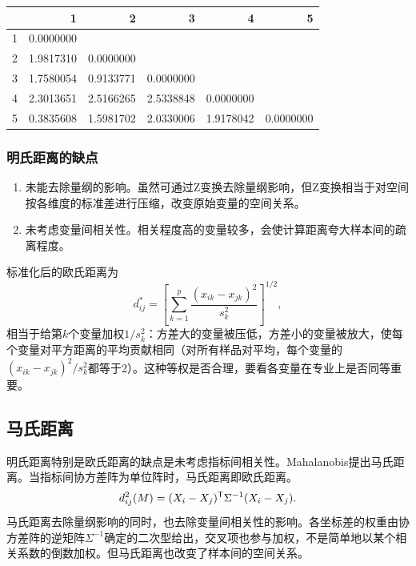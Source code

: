 \par\addvspace{5pt}\begin{center}\begin{minipage}{\linewidth}\centering
\small
{}
\begin{tabular}{lrrrrr}\toprule
 &{\bfseries  1 }&{\bfseries  2 }&{\bfseries  3 }&{\bfseries  4 }&{\bfseries  5}\\\midrule
1 & 0.0000000 &  &  &  & \\
2 & 1.9817310 & 0.0000000 &  &  & \\
3 & 1.7580054 & 0.9133771 & 0.0000000 &  & \\
4 & 2.3013651 & 2.5166265 & 2.5338848 & 0.0000000 & \\
5 & 0.3835608 & 1.5981702 & 2.0330006 & 1.9178042 & 0.0000000\\
\bottomrule\end{tabular}
\end{minipage}\end{center}

\subsubsection{明氏距离的缺点}
\begin{enumerate}
\item 未能去除量纲的影响。虽然可通过Z变换去除量纲影响，但Z变换相当于对空间按各维度的标准差进行压缩，改变原始变量的空间关系。
\item 未考虑变量间相关性。相关程度高的变量较多，会使计算距离夸大样本间的疏离程度。
\end{enumerate}
标准化后的欧氏距离为
\[
d_{ij}^{*}=\left[\sum_{k=1}^p\frac{(x_{ik}-x_{jk})^2}{s_k^2}\right]^{1/2},
\]
相当于给第$k$个变量加权$1/s_k^2$：方差大的变量被压低，方差小的变量被放大，使每个变量对平方距离的平均贡献相同（对所有样品对平均，每个变量的$(x_{ik}-x_{jk})^2/s_k^2$都等于2）。这种等权是否合理，要看各变量在专业上是否同等重要。
\subsection{马氏距离}
明氏距离特别是欧氏距离的缺点是未考虑指标间相关性。Mahalanobis提出马氏距离。当指标间协方差阵为单位阵时，马氏距离即欧氏距离。
\begin{equation}
d_{ij}^2(M)=(X_i-X_j)^{\mathsf T}\Sigma^{-1}(X_i-X_j).
\end{equation}
马氏距离去除量纲影响的同时，也去除变量间相关性的影响。各坐标差的权重由协方差阵的逆矩阵$\Sigma^{-1}$确定的二次型给出，交叉项也参与加权，不是简单地以某个相关系数的倒数加权。但马氏距离也改变了样本间的空间关系。

